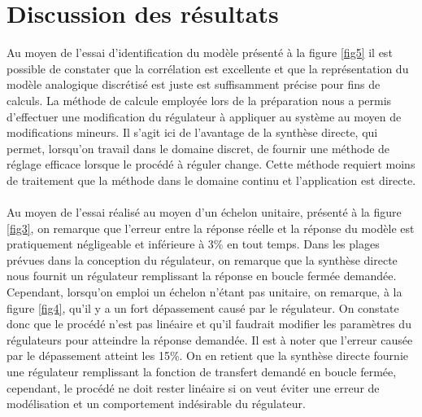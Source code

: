 \section{Discussion des résultats}
Au moyen de l'essai d'identification du modèle présenté à la figure \ref{fig5} il est possible de constater que la corrélation est excellente et que la représentation du modèle analogique discrétisé est juste est suffisamment précise pour fins de calculs. La méthode de calcule employée lors de la préparation nous a permis d'effectuer une modification du régulateur à appliquer au système au moyen de modifications mineurs. Il s'agit ici de l'avantage de la synthèse directe, qui permet, lorsqu'on travail dans le domaine discret, de fournir une méthode de réglage efficace lorsque le procédé à réguler change. Cette méthode requiert moins de traitement que la méthode dans le domaine continu et l'application est directe.

\paragraph{}Au moyen de l'essai réalisé au moyen d'un échelon unitaire, présenté à la figure \ref{fig3}, on remarque que l'erreur entre la réponse réelle et la réponse du modèle est pratiquement négligeable et inférieure à 3\% en tout temps. Dans les plages prévues dans la conception du régulateur, on remarque que la synthèse directe nous fournit un régulateur remplissant la réponse en boucle fermée demandée. Cependant, lorsqu'on emploi un échelon n'étant pas unitaire, on remarque, à la figure \ref{fig4}, qu'il y a un fort dépassement causé par le régulateur. On constate donc que le procédé n'est pas linéaire et qu'il faudrait modifier les paramètres du régulateurs pour atteindre la réponse demandée. Il est à noter que l'erreur causée par le dépassement atteint les 15\%. On en retient que la synthèse directe fournie une régulateur remplissant la fonction de transfert demandé en boucle fermée, cependant, le procédé ne doit rester linéaire si on veut éviter une erreur de modélisation et un comportement indésirable du régulateur.